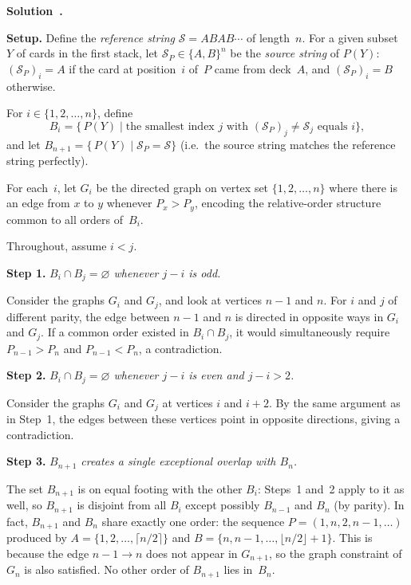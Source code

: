 \documentclass[a4paper,12pt]{article}
\newenvironment{solution}[1][]{%
  \goodbreak\smallskip\par\noindent\textbf{Solution\if\relax\detokenize{#1}\relax\else~#1\fi.}~}%
{%
  \goodbreak
}
\begin{document}
\begin{solution}

\textbf{Setup.}
Define the \emph{reference string} $\mathcal{S} = ABAB\cdots$ of length~$n$.
For a given subset~$Y$ of cards in the first stack, let $\mathcal{S}_P \in \{A,B\}^n$ be the \emph{source string} of $P(Y)$: $(\mathcal{S}_P)_i = A$ if the card at position~$i$ of~$P$ came from deck~$A$, and $(\mathcal{S}_P)_i = B$ otherwise.

For $i \in \{1,2,\ldots,n\}$, define
\[
  B_i = \bigl\{\,P(Y) \;\big|\; \text{the smallest index } j \text{ with } (\mathcal{S}_P)_j \neq \mathcal{S}_j \text{ equals } i \bigr\},
\]
and let $B_{n+1} = \bigl\{\,P(Y) \;\big|\; \mathcal{S}_P = \mathcal{S}\bigr\}$ (i.e.\ the source string matches the reference string perfectly).

For each~$i$, let $G_i$ be the directed graph on vertex set $\{1,2,\ldots,n\}$ where there is an edge from $x$ to $y$ whenever $P_x > P_y$, encoding the relative-order structure common to all orders of~$B_i$.

Throughout, assume $i < j$.

\medskip
\textbf{Step 1.} \textit{$B_i \cap B_j = \varnothing$ whenever $j - i$ is odd.}

Consider the graphs $G_i$ and $G_j$, and look at vertices $n-1$ and $n$. For $i$ and $j$ of different parity, the edge between $n-1$ and $n$ is directed in opposite ways in $G_i$ and $G_j$. If a common order existed in $B_i \cap B_j$, it would simultaneously require $P_{n-1} > P_n$ and $P_{n-1} < P_n$, a contradiction.

\medskip
\textbf{Step 2.} \textit{$B_i \cap B_j = \varnothing$ whenever $j - i$ is even and $j - i > 2$.}

Consider the graphs $G_i$ and $G_j$ at vertices $i$ and $i+2$. By the same argument as in Step~1, the edges between these vertices point in opposite directions, giving a contradiction.

\medskip
\textbf{Step 3.} \textit{$B_{n+1}$ creates a single exceptional overlap with $B_n$.}

The set $B_{n+1}$ is on equal footing with the other $B_i$: Steps~1 and~2 apply to it as well, so $B_{n+1}$ is disjoint from all $B_i$ except possibly $B_{n-1}$ and $B_n$ (by parity).
In fact, $B_{n+1}$ and $B_n$ share exactly one order: the sequence $P = (1, n, 2, n{-}1, \ldots)$ produced by $A = \{1, 2, \ldots, \lceil n/2 \rceil\}$ and $B = \{n, n{-}1, \ldots, \lfloor n/2 \rfloor + 1\}$.
This is because the edge $n{-}1 \to n$ does not appear in $G_{n+1}$, so the graph constraint of $G_n$ is also satisfied. No other order of $B_{n+1}$ lies in~$B_n$.


\end{solution}
\end{document}
